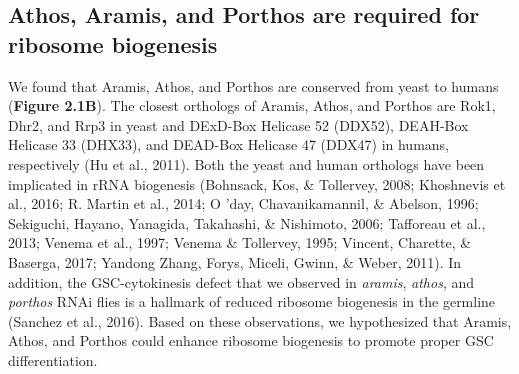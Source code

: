 \documentclass[12pt,oneside]{reedthesis}
\begin{document}
\setlength\parindent{24pt}

\textbf{\hfill\break
}

\hypertarget{athos-aramis-and-porthos-are-required-for-ribosome-biogenesis}{%
\subsection{Athos, Aramis, and Porthos are required for ribosome biogenesis}\label{athos-aramis-and-porthos-are-required-for-ribosome-biogenesis}}

We found that Aramis, Athos, and Porthos are conserved from yeast to humans (\textbf{Figure 2.1B}). The closest orthologs of Aramis, Athos, and Porthos are Rok1, Dhr2, and Rrp3 in yeast and DExD-Box Helicase 52 (DDX52), DEAH-Box Helicase 33 (DHX33), and DEAD-Box Helicase 47 (DDX47) in humans, respectively (Hu et al., 2011). Both the yeast and human orthologs have been implicated in rRNA biogenesis (Bohnsack, Kos, \& Tollervey, 2008; Khoshnevis et al., 2016; R. Martin et al., 2014; O 'day, Chavanikamannil, \& Abelson, 1996; Sekiguchi, Hayano, Yanagida, Takahashi, \& Nishimoto, 2006; Tafforeau et al., 2013; Venema et al., 1997; Venema \& Tollervey, 1995; Vincent, Charette, \& Baserga, 2017; Yandong Zhang, Forys, Miceli, Gwinn, \& Weber, 2011). In addition, the GSC-cytokinesis defect that we observed in \emph{aramis}, \emph{athos}, and \emph{porthos} RNAi flies is a hallmark of reduced ribosome biogenesis in the germline (Sanchez et al., 2016). Based on these observations, we hypothesized that Aramis, Athos, and Porthos could enhance ribosome biogenesis to promote proper GSC differentiation.
\end{document}
